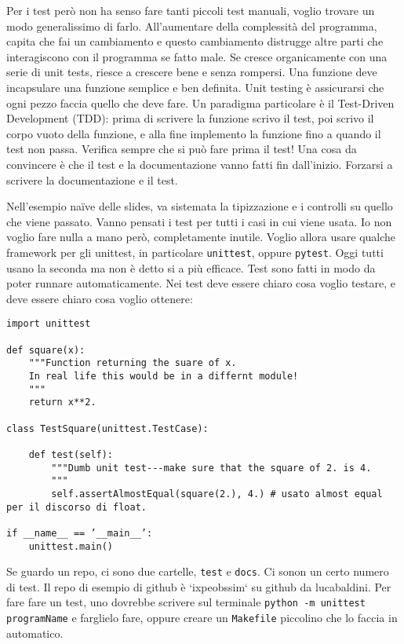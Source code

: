 \documentclass[10pt, a4paper, titlepage]{book}
\begin{document}
Per i test però non ha senso fare tanti piccoli test manuali, voglio trovare un modo generalissimo di farlo. All'aumentare della complessità del programma, capita che fai un cambiamento e questo cambiamento distrugge altre parti che interagiscono con il programma se fatto male.
Se cresce organicamente con una serie di unit tests, riesce a crescere bene e senza rompersi.
Una funzione deve incapsulare una funzione semplice e ben definita. Unit testing è assicurarsi che ogni pezzo faccia quello che deve fare.
Un paradigma particolare è il Test-Driven Development (TDD): prima di scrivere la funzione scrivo il test, poi scrivo il corpo vuoto della funzione, e alla fine implemento la funzione fino a quando il test non passa. Verifica sempre che si può fare prima il test!
Una cosa da convincere è che il test e la documentazione vanno fatti fin dall'inizio.
Forzarsi a scrivere la documentazione e il test.

Nell'esempio naïve delle slides, va sistemata la tipizzazione e i controlli su quello che viene passato. Vanno pensati i test per tutti i casi in cui viene usata.
Io non voglio fare nulla a mano però, completamente inutile. Voglio allora usare qualche framework per gli unittest, in particolare \texttt{unittest}, oppure \texttt{pytest}. Oggi tutti usano la seconda ma non è detto si a più efficace.
Test sono fatti in modo da poter runnare automaticamente. Nei test deve essere chiaro cosa voglio testare, e deve essere chiaro cosa voglio ottenere:
\begin{verbatim}
import unittest

def square(x):
	"""Function returning the suare of x.
	In real life this would be in a differnt module!
	"""
	return x**2.

class TestSquare(unittest.TestCase):

	def test(self):
		"""Dumb unit test---make sure that the square of 2. is 4.
		"""
		self.assertAlmostEqual(square(2.), 4.) # usato almost equal per il discorso di float.

if __name__ == ’__main__’:
	unittest.main()	
\end{verbatim}

Se guardo un repo, ci sono due cartelle, \texttt{test} e \texttt{docs}. Ci sonon un certo numero di test. Il repo di esempio di github è `ixpeobssim` su github da lucabaldini.
Per fare fare un test, uno dovrebbe scrivere sul terminale \texttt{python -m unittest programName} e farglielo fare, oppure creare un \texttt{Makefile} piccolino che lo faccia in automatico.
\end{document}
